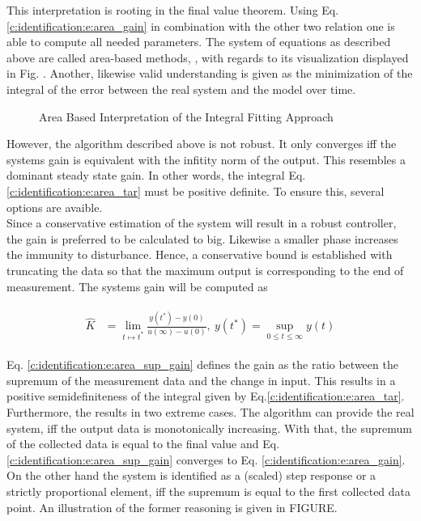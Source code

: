 This interpretation is rooting in the final value theorem. Using Eq. \ref{c:identification:e:area_gain} in combination with the other two relation one is able to compute all needed parameters.\newline
The system of equations as described above are called area-based methods, \cite{Fedele2009a}, with regards to its visualization displayed in Fig. . Another, likewise valid understanding is given as the minimization of the integral of the error between the real system and the model over time.\\

\begin{figure}
  \centering

    
    \caption{Area Based Interpretation of the Integral Fitting Approach}
\end{figure}

However, the algorithm described above is not robust. It only converges iff the systems gain is equivalent with the infitity norm of the output. This resembles a dominant steady state gain. In other words, the integral Eq. \ref{c:identification:e:area_tar} must be positive definite. To ensure this, several options are avaible. \\

Since a conservative estimation of the system will result in a robust controller, the gain is preferred to be calculated to big. Likewise a smaller phase increases the immunity to disturbance. Hence, a conservative bound is established with truncating the data so that the maximum output is corresponding to the end of measurement. The systems gain will be computed as

\begin{align}
\begin{split}
\hat{K} &= \lim_{t\mapsto t^*} \frac{y(t^*)-y(0)}{u(\infty)-u(0)}, ~ y(t^*) = \sup_{0 \leq t \leq \infty} y(t)
\end{split}
\label{c:identification:e:area_sup_gain}
\end{align}

Eq. \ref{c:identification:e:area_sup_gain} defines the gain as the ratio between the supremum of the measurement data and the change in input. This results in a positive semidefiniteness of the integral given by Eq.\ref{c:identification:e:area_tar}. Furthermore, the results in two extreme cases. The algorithm can provide the real system, iff the output data is monotonically increasing. With that, the supremum of the collected data is equal to the final value and Eq.\ref{c:identification:e:area_sup_gain} converges to Eq. \ref{c:identification:e:area_gain}. On the other hand the system is identified as a (scaled) step response or a strictly proportional element, iff the supremum is equal to the first collected data point. An illustration of the former reasoning is given in FIGURE.\\

